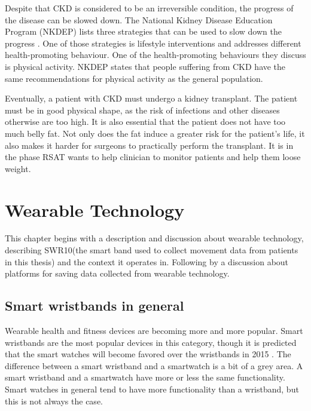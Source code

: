 \documentclass{cslthse-msc}
\begin{document}
Despite that CKD is considered to be an irreversible condition, the progress of the disease can be slowed down. The National Kidney Disease Education Program (NKDEP) lists three strategies that can be used to slow down the progress \cite{NKDEPPROG}. One of those strategies is lifestyle interventions and addresses different health-promoting behaviour. One of the health-promoting behaviours they discuss is physical activity. NKDEP states that people suffering from CKD have the same recommendations for physical activity as the general population. 

Eventually, a patient with CKD must undergo a kidney transplant. The patient must be in good physical shape, as the risk of infections and other diseases otherwise are too high. It is also essential that the patient does not have too much belly fat. Not only does the fat induce a greater risk for the patient's life, it also makes it harder for surgeons to practically perform the transplant. It is in the phase RSAT wants to help clinician to monitor patients and help them loose weight. 


\chapter[Wearable Technology]{Wearable Technology}

This chapter begins with a description and discussion about wearable technology, describing SWR10(the smart band used to collect movement data from patients in this thesis) and the context it operates in. Following by a discussion about platforms for saving data collected from wearable technology. 

\section{Smart wristbands in general}

Wearable health and fitness devices are becoming more and more popular. Smart wristbands are the most popular devices  in this category, though it is predicted that the smart watches will become favored over the wristbands in 2015 \cite{gartner}. The difference between a smart wristband and a smartwatch is a bit of a grey area. A smart wristband and a smartwatch have more or less the same functionality. Smart watches in general tend to have more functionality than a wristband, but this is not always the case. 
\end{document}
